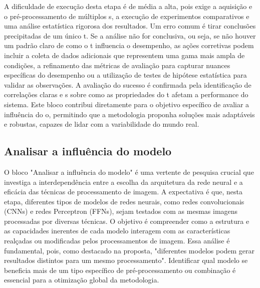 A dificuldade de execução desta etapa é de média a alta, pois exige a aquisição e o pré-processamento de múltiplos s, a execução de experimentos comparativos e uma análise estatística rigorosa dos resultados. Um erro comum é tirar conclusões precipitadas de um único t. Se a análise não for conclusiva, ou seja, se não houver um padrão claro de como o t influencia o desempenho, as ações corretivas podem incluir a coleta de dados adicionais que representem uma gama mais ampla de condições, a refinamento das métricas de avaliação para capturar nuances específicas do desempenho ou a utilização de testes de hipótese estatística para validar as observações. A avaliação do sucesso é confirmada pela identificação de correlações claras e s sobre como as propriedades do t afetam a performance do sistema. Este bloco contribui diretamente para o objetivo específico de avaliar a influência do o, permitindo que a metodologia proponha soluções mais adaptáveis e robustas, capazes de lidar com a variabilidade do mundo real.

\subsection{Analisar a influência do modelo}
O bloco "Analisar a influência do modelo" é uma vertente de pesquisa crucial que investiga a interdependência entre a escolha da arquitetura da rede neural e a eficácia das técnicas de processamento de imagem. A expectativa é que, nesta etapa, diferentes tipos de modelos de redes neurais, como redes convolucionais (CNNs) e redes Perceptron (FFNs), sejam testados com as mesmas imagens processadas por diversas técnicas. O objetivo é compreender como a estrutura e as capacidades inerentes de cada modelo interagem com as características realçadas ou modificadas pelos processamentos de imagem. Essa análise é fundamental, pois, como destacado na proposta, "diferentes modelos podem gerar resultados distintos para um mesmo processamento". Identificar qual modelo se beneficia mais de um tipo específico de pré-processamento ou combinação é essencial para a otimização global da metodologia.

